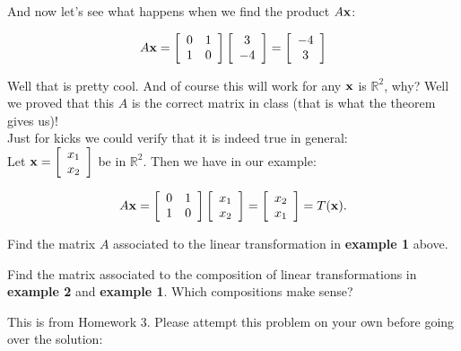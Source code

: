 \documentclass[12pt]{article}
\begin{document}
\noindent And now let's see what happens when we find the product $A {\bf x}$:

\[ A{\bf x} = \left[ \begin{array}{cc} 0 &1\\1&0  \end{array} \right] \left[ \begin{array}{c} 3 \\ -4  \end{array} \right] = \left[ \begin{array}{c} -4 \\ 3  \end{array} \right] \] 

\noindent Well that is pretty cool.  And of course this will work for any ${\bf x}$ is $\mathbb{R}^2$, why?  Well we proved that this $A$ is the correct matrix in class (that is what the theorem gives us)!\\

\noindent Just for kicks we could verify that it is indeed true in general:  \\

\noindent Let ${\bf x}=\left[ \begin{array}{c} x_1 \\ x_2  \end{array} \right]$ be in $\mathbb{R}^2$.  Then we have in our example:

\[ A{\bf x} = \left[ \begin{array}{cc} 0 &1\\1&0  \end{array} \right] \left[ \begin{array}{c} x_1 \\ x_2  \end{array} \right] = \left[ \begin{array}{c} x_2 \\ x_1  \end{array} \right] = T({\bf x}). \]

  Find the matrix $A$ associated to the linear transformation in {\bf example 1} above.

  Find the matrix associated to the composition of linear transformations in {\bf example 2} and {\bf example 1}.  Which compositions make sense? 

  This is from Homework 3.  Please attempt this problem on your own before going over the solution:\\
\end{document}
